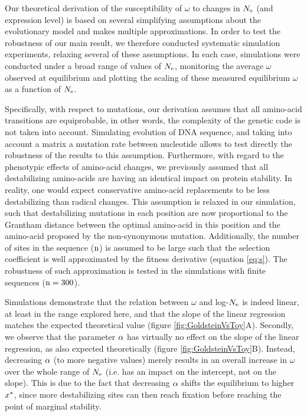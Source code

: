 \documentclass{MBE}%
\begin{document}
Our theoretical derivation of the susceptibility of $\omega$ to changes in $N_{\mathrm{e}}$ (and expression level) is based on several simplifying assumptions about the evolutionary model and makes multiple approximations.
In order to test the robustness of our main result, we therefore conducted systematic simulation experiments, relaxing several of these assumptions.
In each case, simulations were conducted under a broad range of values of $N_{\mathrm{e}}$, monitoring the average $\omega$ observed at equilibrium and plotting the scaling of these measured equilibrium $\omega$ as a function of $N_{\mathrm{e}}$. 

Specifically, with respect to mutations, our derivation assumes that all amino-acid transitions are equiprobable, in other words, the complexity of the genetic code is not taken into account.
Simulating evolution of DNA sequence, and taking into account a matrix a mutation rate between nucleotide allows to test directly the robustness of the results to this assumption.
Furthermore, with regard to the phenotypic effects of amino-acid changes, we previously assumed that all destabilizing amino-acids are having an identical impact on protein stability.
In reality, one would expect conservative amino-acid replacements to be less destabilizing than radical changes.
This assumption is relaxed in our simulation, such that destabilizing mutations in each position are now proportional to the Grantham distance \citep{Grantham1974} between the optimal amino-acid in this position and the amino-acid proposed by the non-synonymous mutation.
Additionally, the number of sites in the sequence ($\text{n}$) is assumed to be large such that the selection coefficient is well approximated by the fitness derivative (equation \ref{eq:s}).
The robustness of such approximation is tested in the simulations with finite sequences ($\text{n}=300$).

Simulations demonstrate that the relation between $\omega$ and log-$N_{\mathrm{e}}$ is indeed linear, at least in the range explored here, and that the slope of the linear regression matches the expected theoretical value (figure \ref{fig:GoldsteinVsToy}A).
Secondly, we observe that the parameter $\alpha$ has virtually no effect on the slope of the linear regression, as also expected theoretically (figure \ref{fig:GoldsteinVsToy}B). Instead, decreasing $\alpha$ (to more negative values) merely results in an overall increase in $\omega$ over the whole range of $N_{\mathrm{e}}$ (i.e. has an impact on the intercept, not on the slope). This is due to the fact that decreasing $\alpha$ shifts the equilibrium to higher $x^{*}$, since more destabilizing sites can then reach fixation before reaching the point of marginal stability.
\end{document}
